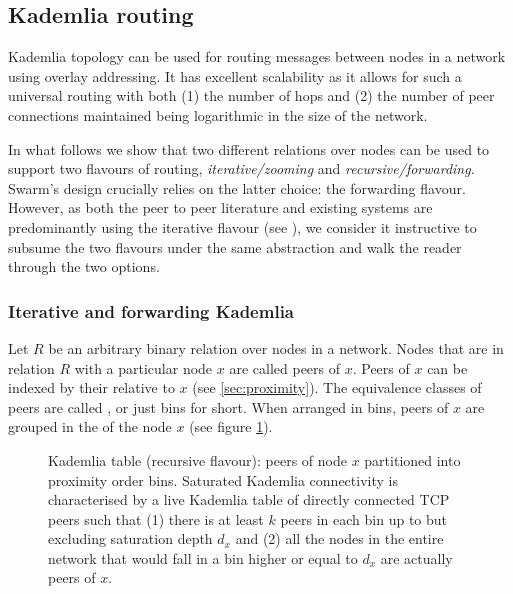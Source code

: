 \subsection{Kademlia routing}\label{sec:kademlia-routing}

Kademlia topology can be used for routing messages between nodes in a network using overlay addressing. It has excellent scalability as it allows for such a universal routing with both (1) the number of hops and (2) the number of peer connections maintained being logarithmic in the size of the network. 

In what follows we show that two different relations over nodes can be used to support two flavours of routing, \emph{iterative/zooming} and \emph{recursive/forwarding}. Swarm's design crucially relies on the latter choice: the forwarding flavour. However, as both the peer to peer literature and existing systems are predominantly using the iterative flavour (see \cite{maymounkov2002kademlia,baumgart2007s,lua2005survey}), we consider it instructive to subsume the two flavours under the same abstraction and walk the reader through the two options.

\subsubsection{Iterative and forwarding Kademlia}

Let $R$ be an arbitrary binary relation over nodes in a network. Nodes that are in relation $R$ with a particular node $x$ are called peers of $x$. Peers of $x$ can be indexed by their  relative to $x$ (see \ref{sec:proximity}).
The equivalence classes of peers are called , or just bins for short. When arranged in bins, peers of $x$ are grouped in the  of the node $x$ (see figure \ref{fig:kademlia-table}). 


\begin{figure}[htbp]
   \centering
   \caption[Kademlia table (recursive flavour)]{Kademlia table (recursive flavour):  peers of node $x$ partitioned into proximity order bins. Saturated Kademlia connectivity is 
   characterised by a live Kademlia table of directly connected TCP peers such that (1) there is at least $k$ peers in each bin up to but excluding saturation depth $d_x$ and (2) all the nodes in the entire network that would fall in a bin higher or equal to $d_x$ are actually peers of $x$. }
   \label{fig:kademlia-table}
\end{figure}



